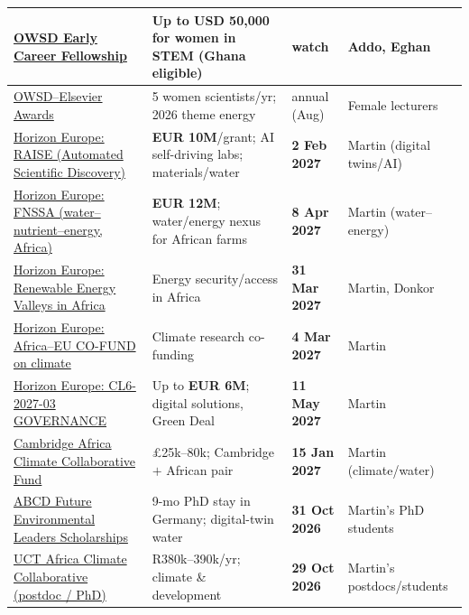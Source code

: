 \documentclass[11pt,a4paper]{article}
\begin{document}
\begin{longtable}{@{}p{3.4cm}p{5.6cm}p{2.2cm}p{2.7cm}@{}}
\midrule
\href{https://owsd.net/early-career-fellowship}{OWSD Early Career Fellowship} & Up to \textbf{USD 50{,}000} for women in STEM (Ghana eligible) & watch & Addo, Eghan \\
\midrule
\href{https://owsd.net/awards}{OWSD--Elsevier Awards} & 5 women scientists/yr; 2026 theme energy & annual (Aug) & Female lecturers \\
\midrule
\href{https://topictree.ideal-ist.eu/topic/6992}{Horizon Europe: RAISE (Automated Scientific Discovery)} & \textbf{EUR 10M}/grant; AI self-driving labs; materials/water & \textbf{2 Feb 2027} & Martin (digital twins/AI) \\
\midrule
\href{https://www.horizon-europe.gouv.fr/optimising-water-nutrient-energy-nexus-sustainable-and-climate-smart-agriculture-africa-fnssa-41643}{Horizon Europe: FNSSA (water--nutrient--energy, Africa)} & \textbf{EUR 12M}; water/energy nexus for African farms & \textbf{8 Apr 2027} & Martin (water--energy) \\
\midrule
\href{https://www.africaeuropeinnovation.net/fr/opportunites-de-financement/}{Horizon Europe: Renewable Energy Valleys in Africa} & Energy security/access in Africa & \textbf{31 Mar 2027} & Martin, Donkor \\
\midrule
\href{https://www.africaeuropeinnovation.net/fr/opportunites-de-financement/}{Horizon Europe: Africa--EU CO-FUND on climate} & Climate research co-funding & \textbf{4 Mar 2027} & Martin \\
\midrule
\href{https://ogr.knust.edu.gh/funding/horizon-cl6-2027-03-governance-innovative-governance-environmental-observations-and-digital}{Horizon Europe: CL6-2027-03 GOVERNANCE} & Up to \textbf{EUR 6M}; digital solutions, Green Deal & \textbf{11 May 2027} & Martin \\
\midrule
\href{https://www.cambridge-africa.cam.ac.uk/initiatives/2026-call-for-applications/}{Cambridge Africa Climate Collaborative Fund} & \pounds25k--80k; Cambridge $+$ African pair & \textbf{15 Jan 2027} & Martin (climate/water) \\
\midrule
\href{https://opportunityforafrica.org/blog/apply-for-the-abcd-future-environmental-leaders-scholarships-2027-9-month-phd-research-stay-in-germany-for-global-south-scholars/}{ABCD Future Environmental Leaders Scholarships} & 9-mo PhD stay in Germany; digital-twin water & \textbf{31 Oct 2026} & Martin's PhD students \\
\midrule
\href{https://acdi.uct.ac.za/africaclimatecollaborative/postdoctoral-research-fellowships-climate-and-development}{UCT Africa Climate Collaborative (postdoc / PhD)} & R380k--390k/yr; climate \& development & \textbf{29 Oct 2026} & Martin's postdocs/students \\

\end{longtable}
\end{document}
